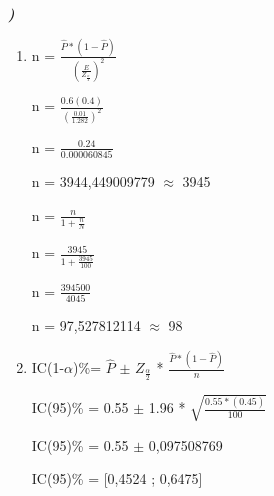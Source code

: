 \documentclass[12pt]{article}
\newcounter{instn}
\newcommand{\instnum}{\arabic{instn}}
\newcommand{\myline}[1]{
    \emph{\textbf{#1)}}
    \addtocounter{instn}{1}
}
\newenvironment{question}
 {
    \myline{\instnum} 
    }
    {
 }
\begin{document}
    \begin{question}
        
        \begin{enumerate}[label={\textbf{\alph*)}}]

            \item 
                  n = $\frac{\hat{P}*(1-\hat{P})}{(\frac{E}{Z_\frac{\alpha}{2}})^2}$
            
                  n = $\frac{0.6(0.4)}{(\frac{0.01}{1.282})^2}$

                  n = $\frac{0.24}{0.000060845}$

                  n = 3944,449009779 $\approx$ 3945

                  n = $\frac{n}{1+ \frac{n}{N}}$

                  n = $\frac{3945}{1+\frac{3945}{100}}$

                  n = $\frac{394500}{4045}$

                  n = 97,527812114 $\approx$ 98
            
            \item 

                 IC(1-$\alpha$)\%= $\hat{P}$ $\pm$ $Z_\frac{\alpha}{2}$ * $\frac{\hat{P}*(1-\hat{P})}{n}$

                 IC(95)\% = 0.55 $\pm$ 1.96 * $\sqrt{\frac{0.55*(0.45)}{100}}$ 
        
                 IC(95)\% = 0.55 $\pm$ 0,097508769
        
                 IC(95)\% = [0,4524 ; 0,6475]
        \end{enumerate}
    \end{question}

\end{document}
